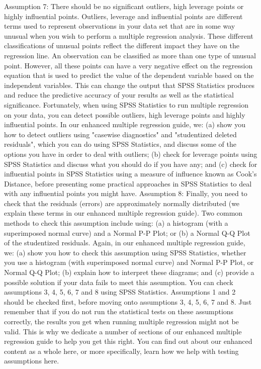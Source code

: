 \documentclass[]{article}
\begin{document}
	Assumption 7: There should be no significant outliers, high leverage points or highly influential points. Outliers, leverage and influential points are different terms used to represent observations in your data set that are in some way unusual when you wish to perform a multiple regression analysis. These different classifications of unusual points reflect the different impact they have on the regression line. An observation can be classified as more than one type of unusual point. However, all these points can have a very negative effect on the regression equation that is used to predict the value of the dependent variable based on the independent variables. This can change the output that SPSS Statistics produces and reduce the predictive accuracy of your results as well as the statistical significance. Fortunately, when using SPSS Statistics to run multiple regression on your data, you can detect possible outliers, high leverage points and highly influential points. In our enhanced multiple regression guide, we: (a) show you how to detect outliers using "casewise diagnostics" and "studentized deleted residuals", which you can do using SPSS Statistics, and discuss some of the options you have in order to deal with outliers; (b) check for leverage points using SPSS Statistics and discuss what you should do if you have any; and (c) check for influential points in SPSS Statistics using a measure of influence known as Cook's Distance, before presenting some practical approaches in SPSS Statistics to deal with any influential points you might have.
	Assumption 8: Finally, you need to check that the residuals (errors) are approximately normally distributed (we explain these terms in our enhanced multiple regression guide). Two common methods to check this assumption include using: (a) a histogram (with a superimposed normal curve) and a Normal P-P Plot; or (b) a Normal Q-Q Plot of the studentized residuals. Again, in our enhanced multiple regression guide, we: (a) show you how to check this assumption using SPSS Statistics, whether you use a histogram (with superimposed normal curve) and Normal P-P Plot, or Normal Q-Q Plot; (b) explain how to interpret these diagrams; and (c) provide a possible solution if your data fails to meet this assumption.
	You can check assumptions 3, 4, 5, 6, 7 and 8 using SPSS Statistics. Assumptions 1 and 2 should be checked first, before moving onto assumptions 3, 4, 5, 6, 7 and 8. Just remember that if you do not run the statistical tests on these assumptions correctly, the results you get when running multiple regression might not be valid. This is why we dedicate a number of sections of our enhanced multiple regression guide to help you get this right. You can find out about our enhanced content as a whole here, or more specifically, learn how we help with testing assumptions here.
	
\end{document}
